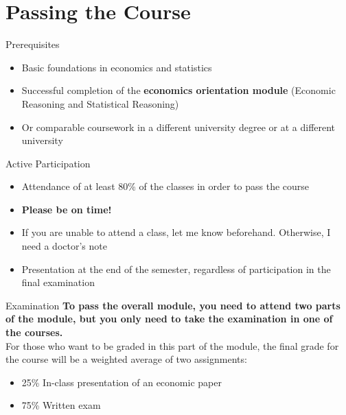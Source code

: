 \documentclass{beamer}
\begin{document}
\section{Passing the Course}

\begin{frame}{Prerequisites}
    \begin{itemize}
        \item Basic foundations in economics and statistics 
        \item Successful completion of the \textbf{economics orientation module} (Economic Reasoning and Statistical Reasoning) 
        \item Or comparable coursework in a different university degree or at a different university
    \end{itemize}
\end{frame}

\begin{frame}{Active Participation}
    \begin{itemize}
        \item Attendance of at least 80\% of the classes in order to pass the course
        \item \textbf{Please be on time!}
        \item If you are unable to attend a class, let me know beforehand. Otherwise, I need a doctor's note
        \item Presentation at the end of the semester, regardless of participation in the final examination
    \end{itemize}
\end{frame}

\begin{frame}{Examination}
    \textbf{To pass the overall module, you need to attend two parts of the module, but you only need to take the examination in one of the courses.} \\
    For those who want to be graded in this part of the module, the final grade for the course will be a weighted average of two assignments:
    \begin{itemize}
        \item 25\% In-class presentation of an economic paper 
        \item 75\% Written exam
    \end{itemize}
\end{frame}
\end{document}
